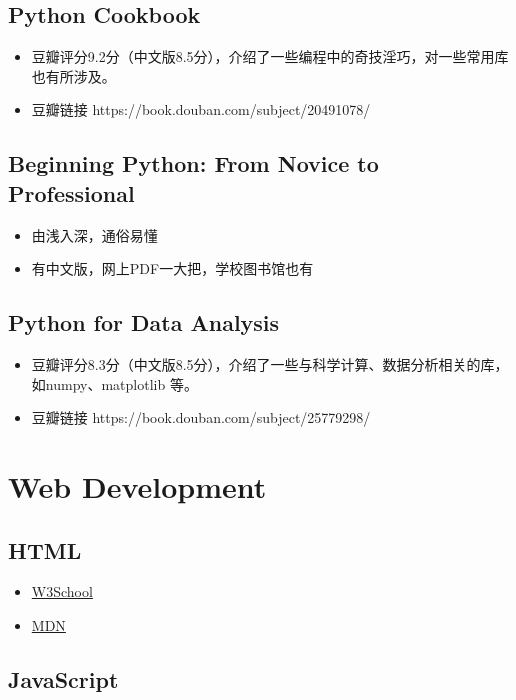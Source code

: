 \documentclass{ctexart}
\begin{document}
\subsection{Python Cookbook}
\begin{itemize}
	\item 豆瓣评分9.2分（中文版8.5分），介绍了一些编程中的奇技淫巧，对一些常用库也有所涉及。
	\item 豆瓣链接 https://book.douban.com/subject/20491078/
\end{itemize}

\subsection{Beginning Python: From Novice to Professional}
\begin{itemize}
	\item 由浅入深，通俗易懂
 	\item 有中文版，网上PDF一大把，学校图书馆也有
\end{itemize}   
 
\subsection{Python for Data Analysis}

\begin{itemize}
	\item 豆瓣评分8.3分（中文版8.5分），介绍了一些与科学计算、数据分析相关的库，如numpy、matplotlib 等。
	\item 豆瓣链接 https://book.douban.com/subject/25779298/
\end{itemize}

\section{Web Development}
\subsection{HTML}
\begin{itemize}
\item \href{http://www.w3school.com.cn/}{W3School}
\item \href{https://developer.mozilla.org/en-US/}{MDN}
\end{itemize}
\subsection{JavaScript}
\end{document}
